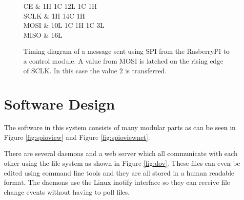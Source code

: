 \documentclass{article}
\begin{document}
\begin{figure}[h!]
\begin{center}
\begin{tikztimingtable}
	[xscale=2.0, yscale=2.0]
	CE	 & {1H} 1{C} {12L} 1{C} {1H} \\
	SCLK & {1H} 14{C} {1H} \\
	MOSI & 10L 1{C} 1{H} 1{C} 3L \\
	MISO & 16L \\
\end{tikztimingtable}
\end{center}
\caption{Timing diagram of a message sent using SPI from
the RasberryPI to a control module.
A value from MOSI is latched on the rising edge of SCLK.
In this case the value 2 is transferred.}
\label{fig:timing}
\end{figure}

%
%
%



\pagebreak

\FloatBarrier
\section{Software Design}
\label{sec:swdesign}

The software in this system consists of many modular parts as
can be seen in Figure \ref{fig:spioview} and Figure \ref{fig:spioviewnet}.

There are several daemons and a web server which all communicate with
each other using the file system as shown in Figure \ref{fig:dov}.
These files can even be edited using command line tools and
they are all stored in a human readable format.
The daemons use the Linux inotify interface so they can receive
file change events without having to poll files.
\end{document}
